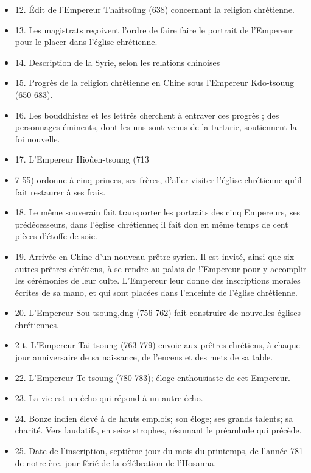 \begin{itemize}
\item 12. Édit de l'Empereur Thaïtsoûng
(638) concernant la religion chrétienne. 
\item 13. Les magistrats reçoivent
l'ordre de faire faire le portrait de l'Empereur pour le placer dans l'église chrétienne.
\item14. Description de la Syrie, selon les relations chinoises
\item 15. Progrès
de la religion chrétienne en Chine sous l'Empereur Kdo-tsouug (650-683).
\item 16. Les bouddhistes et les lettrés cherchent à entraver ces progrès ; des personnages éminents, dont les uns sont venus de la tartarie, soutiennent la foi
nouvelle. 
\item 17. L'Empereur Hioûen-tsoung (713\item7 55) ordonne à cinq princes,
ses frères, d'aller visiter l'église chrétienne qu'il fait restaurer à ses frais.
\item 18. Le
même souverain fait transporter les portraits des cinq Empereurs, ses prédécesseurs,
dans l'église chrétienne; il fait don en même temps de cent pièces d'étoffe
de soie. 
\item 19. Arrivée en Chine d'un nouveau prêtre syrien. Il est invité, ainsi
que six autres prêtres chrétiens, à se rendre au palais de !'Empereur pour y accomplir les cérémonies de leur culte. L'Empereur leur donne des inscriptions morales
écrites de sa mano, et qui sont placées dans l'enceinte de l'église chrétienne.

\item 20. L'Empereur Sou-tsoung,dng (756-762) fait construire de nouvelles églises chrétiennes. 
\item 2 t. L'Empereur Tai-tsoung (763-779) envoie aux prêtres chrétiens,
à chaque jour anniversaire de sa naissance, de l'encens et des mets de sa table.
\item 22. L'Empereur Te-tsoung (780-783); éloge enthousiaste de cet Empereur.
\item 23. La vie est un écho qui répond à un autre écho. 
\item 24. Bonze indien élevé
à de hauts emplois; son éloge; ses grands talents; sa charité. Vers laudatifs,
en seize strophes, résumant le préambule qui précède. 
\item 25. Date de l'inscription,
septième jour du mois du printemps, de l'année 781 de notre ère, jour férié
de la célébration de l'Hosanna.
\end{itemize}



